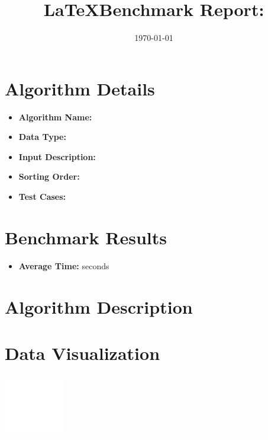 \documentclass{article}
\title{\textbf{\LaTeX Benchmark Report: \algorithmName}}
\date{\today}
\begin{document}
\maketitle

\section*{Algorithm Details}
\begin{itemize}
    \item \textbf{Algorithm Name:} \algorithmName
    \item \textbf{Data Type:} \dataType
    \item \textbf{Input Description:} 
    \item \textbf{Sorting Order:} \order
    \item \textbf{Test Cases:} \testCases
\end{itemize}

\section*{Benchmark Results}
\begin{itemize}
    \item \textbf{Average Time:} \averageTime seconds
\end{itemize}

\section*{Algorithm Description}
\description

\section*{Data Visualization}
\includegraphics[width=\textwidth]{visualization_placeholder.png} %
\end{document}

